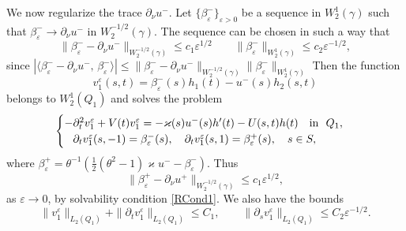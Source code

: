 \documentclass[reqno]{amsart}
\theoremstyle{plain}
\numberwithin{equation}{section}
\renewcommand{\kappa}{\varkappa}
\newcommand{\eps}{\varepsilon}
\renewcommand{\leq}{\leqslant}
\newcommand{\pte}{\partial_t}
\begin{document}
We now regularize the trace $\partial_\nu u^-$.  Let $\{\beta_\eps^-\}_{\eps>0}$ be a sequence in $W_2^{1}(\gamma)$ such that $\beta_\eps^-\to  \partial_\nu u^-$ in  $W_2^{-1/2}(\gamma)$.
The sequence can be chosen in such a way that
\begin{equation}\label{EstBetaEps}
  \|\beta_\eps^--\partial_\nu u^-\|_{W_2^{-1/2}(\gamma)}\leq c_1 \eps^{1/2}\qquad   \|\beta_\eps^-\|_{W_2^1(\gamma)}\leq c_2 \eps^{-1/2},
\end{equation}
since $|\langle\beta_\eps^--\partial_\nu u^-,\,\beta_\eps^-\rangle|\leq
\|\beta_\eps^--\partial_\nu u^-\|_{W_2^{-1/2}(\gamma)}\|\beta_\eps^-\|_{W_2^{1}(\gamma)}
$
Then the function
\begin{equation}\label{representV1Eps}
    v_1^\eps(s,t)= \beta_\eps^-(s)h_1(t)-u^-(s)h_2(s,t)
\end{equation}
belongs to $W_2^1(Q_1)$ and solves the problem
\begin{equation}\label{ProblemV1eps}
\begin{cases}
   -\pte^2 v_1^\eps+V(t)v_1^\eps=-\kappa(s)u^-(s)h'(t)-U(s,t)h(t)\quad \hbox{in \ } Q_1, \\
    \phantom{-}\partial_t v_1^\eps(s, -1)=\beta_\eps^-(s), \quad
\partial_t v_1^\eps(s, 1)=\beta_\eps^+(s),\quad s\in S,
\end{cases}
\end{equation}
where $ \beta_\eps^+=\theta^{-1}
\left(\textstyle\frac{1}{2 }(\theta^2-1)\kappa u^--\beta_\eps^-\right)$.
Thus
\begin{equation}\label{BetaEpsPlus}
  \|\beta_\eps^+-\partial_\nu u^+\|_{W_2^{-1/2}(\gamma)}\leq c_1 \eps^{1/2},
\end{equation}
as $\eps\to 0$, by solvability condition \eqref{RCond1}. We also have the bounds
\begin{equation}\label{DerivOfV1Bounds}
  \|v_1^\eps\|_{L_2(Q_1)}+ \|\partial_t v_1^\eps\|_{L_2(Q_1)}\leq C_1,
   \qquad\|\partial_s v_1^\eps\|_{L_2(Q_1)}\leq C_2\eps^{-1/2}.
\end{equation}
\end{document}
